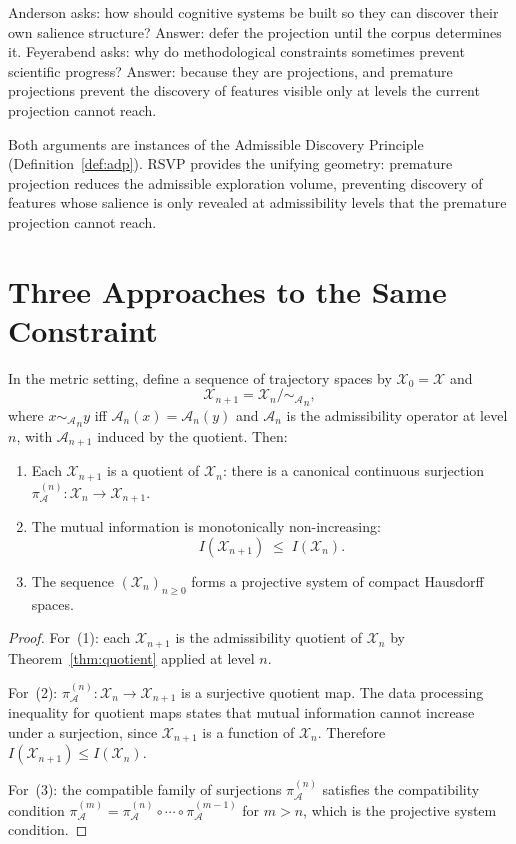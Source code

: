 \documentclass[12pt, a4paper, oneside]{book}
\newcommand{\Adm}{\mathcal{A}}
\newcommand{\X}{\mathcal{X}}
\newcommand{\projA}{\pi_{\!\Adm}}
\newcommand{\SA}{{\sim_{\!\Adm}}}
\begin{document}
Anderson asks: how should cognitive systems be built so they can
discover their own salience structure? Answer: defer the projection until
the corpus determines it. Feyerabend asks: why do methodological
constraints sometimes prevent scientific progress? Answer: because they
are projections, and premature projections prevent the discovery of
features visible only at levels the current projection cannot reach.

Both arguments are instances of the Admissible Discovery Principle
(Definition~\ref{def:adp}). RSVP provides the unifying geometry:
premature projection reduces the admissible exploration volume, preventing
discovery of features whose salience is only revealed at admissibility
levels that the premature projection cannot reach.

\section{Three Approaches to the Same Constraint}

\begin{theorem}
\label{thm:recursive-abstraction}
In the metric setting, define a sequence of trajectory spaces by
$\X_0 = \X$ and
\[
  \X_{n+1} = \X_n \big/\!\SA_n,
\]
where $x \SA_n y$ iff $\Adm_n(x) = \Adm_n(y)$ and $\Adm_n$ is the
admissibility operator at level $n$, with $\Adm_{n+1}$ induced by the
quotient. Then:
\begin{enumerate}
  \item Each $\X_{n+1}$ is a quotient of $\X_n$: there is a canonical
    continuous surjection $\projA^{(n)} : \X_n \to \X_{n+1}$.
  \item The mutual information is monotonically non-increasing:
    \[
      I(\X_{n+1}) \;\leq\; I(\X_n).
    \]
  \item The sequence $(\X_n)_{n \geq 0}$ forms a projective system of
    compact Hausdorff spaces.
\end{enumerate}
\end{theorem}

\begin{proof}
For~(1): each $\X_{n+1}$ is the admissibility quotient of $\X_n$ by
Theorem~\ref{thm:quotient} applied at level $n$.

For~(2): $\projA^{(n)} : \X_n \to \X_{n+1}$ is a surjective quotient
map. The data processing inequality for quotient maps states that mutual
information cannot increase under a surjection, since $\X_{n+1}$ is a
function of $\X_n$. Therefore $I(\X_{n+1}) \leq I(\X_n)$.

For~(3): the compatible family of surjections $\projA^{(n)}$ satisfies
the compatibility condition $\projA^{(m)} = \projA^{(n)} \circ \cdots
\circ \projA^{(m-1)}$ for $m > n$, which is the projective system
condition.
\end{proof}
\end{document}
